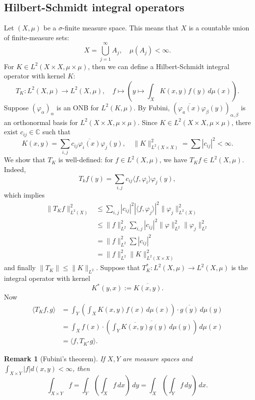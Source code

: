 \documentclass[10pt, a4paper]{article}
\newtheorem*{remark}{Remark}
\newcommand{\C}{\mathbb {C}}
\begin{document}
\subsection{Hilbert-Schmidt integral operators}

Let $(X, \mu)$ be a $\sigma$-finite measure space.
This means that $X$ is a countable union of finite-measure sets:
$$X = \bigcup_{j = 1} ^\infty A_j,\quad \mu(A_j) < \infty.$$
For $K \in L^2 (X \times X, \mu \times \mu)$, then we can define a Hilbert-Schmidt integral operator 
with kernel $K$:
$$T_K : L^2 (X, \mu) \to L^2 (X, \mu),\quad f \mapsto \left(y \mapsto \int_X K(x, y) f(y)\, d\mu (x)\right).$$
Suppose $(\varphi_\alpha)_{\alpha}$ is an ONB for $L^2 (K, \mu)$.
By Fubini, $\left(\overline{\varphi_a (x)} \varphi_\beta (y)\right)_{\alpha, \beta}$
is an orthonormal basis for $L^2 (X \times X, \mu \times \mu)$.
Since $K \in L^2 (X \times X, \mu \times \mu)$, there exist $c_{ij} \in \C$ such that 
$$K(x, y) = \sum_{i,j} c_{ij} \overline{\varphi_i (x)} \varphi_j (y),\quad \| K\|^2 _{L^2 (X \times X)} = \sum |c_{ij}|^2 < \infty.$$
We show that $T_K$ is well-defined: for $f \in L^2 (X, \mu)$, we have $T_K f \in L^2 (X,\mu)$.
Indeed,
$$T_k f (y) = \sum_{i, j} c_{ij} \langle f, \varphi_i \rangle \varphi_j (y),$$
which implies 
\begin{align*}
  \| T_K f\|_{L^2 (X)} ^2 &\leq \sum_{i, j} |c_{ij}|^2 |\langle f, \varphi_j\rangle|^2 \| \varphi_j\|^2 _{L^2 (X)}\\
  &\leq \| f\|_{L^2} ^2 \sum_{i, j} |c_{ij}|^2 \| \varphi\|^2 _{L^2} \| \varphi_j\|^2 _{L^2}\\
  &= \| f\|^2 _{L^2} \sum|c_{ij}|^2\\
  &= \| f\|^2 _{L^2} \|K\|^2 _{L^2 (X \times X)}
\end{align*}
and finally $\| T_K\| \leq \|K\|_{L^2}$.
Suppose that $T_K ^* : L^2 (X, \mu) \to L^2 (X, \mu)$ is the integral operator with kernel 
$$K^* (y, x) := \overline{K(x, y)}.$$
Now 
\begin{align*}
  \langle T_K f, g \rangle &= \int_Y \left(\int_X K(x, y) f(x) \, d\mu (x)\right) \cdot \overline{g(y)}\, d\mu (y)\\
  &= \int_X f(x) \cdot \left(\overline{\int_Y \overline{K(x, y)} g(y)\, d\mu(y)}\right)\, d\mu (x)\\ 
  &= \langle f, T_{K^*} g \rangle.
\end{align*}

\begin{remark}[Fubini's theorem]
  If $X, Y$ are measure spaces and $\int_{X \times Y} |f| d(x, y) < \infty$, then 
  $$\int_{X \times Y} f = \int_Y \left(\int_X f\, dx\right)\, dy = \int_X \left(\int_Y f\, dy\right)\, dx.$$
\end{remark}
\end{document}
